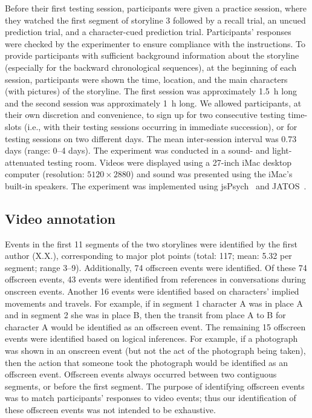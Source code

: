 \documentclass[10pt]{article}
\begin{document}
Before their first testing session, participants were given a practice session, where they watched the first segment of storyline 3 followed by a recall trial, an uncued prediction trial, and a character-cued prediction trial. Participants' responses were checked by the experimenter to ensure compliance with the instructions. To provide participants with sufficient background information about the storyline (especially for the backward chronological sequences), at the beginning of each session, participants were shown the time, location, and the main characters (with pictures) of the storyline. The first session was approximately 1.5~h long and the second session was approximately 1~h long. We allowed participants, at their own discretion and convenience, to sign up for two consecutive testing time-slots (i.e., with their testing sessions occurring in immediate succession), or for testing sessions on two different days. The mean inter-session interval was 0.73 days (range: 0--4 days). The experiment was conducted in a sound- and light-attenuated testing room. Videos were displayed using a 27-inch iMac desktop computer (resolution: $5120 \times 2880$) and sound was presented using the iMac’s built-in speakers. The experiment was implemented using jsPsych~\citep{deLe15} and JATOS~\citep{LangEtal15}.

\subsection*{Video annotation}
Events in the first 11 segments of the two storylines were identified by the first author (X.X.), corresponding to major plot points (total: 117; mean: 5.32 per segment; range 3--9). Additionally, 74 offscreen events were identified. Of these 74 offscreen events, 43 events were identified from references in conversations during onscreen events. Another 16 events were identified based on characters’ implied movements and travels.  For example, if in segment 1 character A was in place A and in segment 2 she was in place B, then the transit from place A to B for character A would be identified as an offscreen event. The remaining 15 offscreen events were identified based on logical inferences.  For example, if a photograph was shown in an onscreen event (but not the act of the photograph being taken), then the action that someone took the photograph would be identified as an offscreen event.  Offscreen events always occurred between two contiguous segments, or before the first segment. The purpose of identifying offscreen events was to match participants’ responses to video events; thus our identification of these offscreen events was not intended to be exhaustive.
\end{document}

